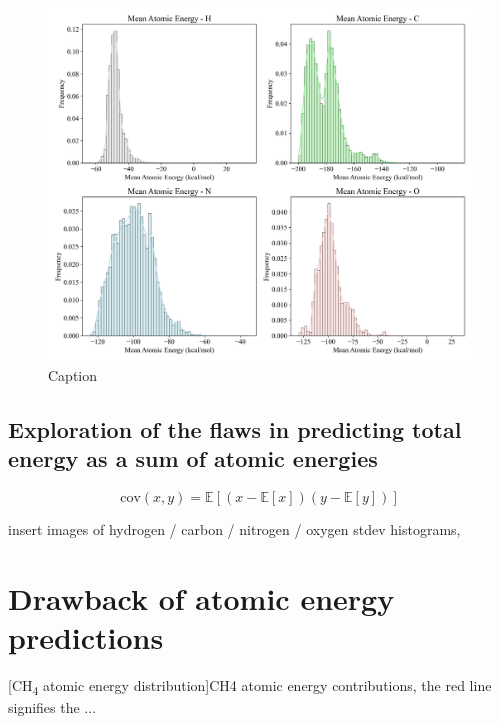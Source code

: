 \begin{figure}[!hb]
    \centering
    \includegraphics[width=1\linewidth]{Images/2xr_outputs/2xr_1x-first_mean-ae-per-atomtype.png}
    \caption{Caption}
    \label{fig:2xr_1x-first_mean-ae-per-atomtype}
\end{figure}

\subsection{Exploration of the flaws in predicting total energy as a sum of atomic energies}
\label{subsec:flaws_in_atomic_energies}


\begin{equation}
    \label{eq:covariance}
    \text{cov}(x, y) = \mathbb{E}[(x - \mathbb{E}[x])(y - \mathbb{E}[y])]
\end{equation}

insert images of hydrogen / carbon / nitrogen / oxygen stdev histograms, 



\section{Drawback of atomic energy predictions}



\begin{multiFigure}
\label{fig:ch4}
[CH\textsubscript{4} atomic energy distribution]{CH4 atomic energy contributions, the red line signifies the ...}
\end{multiFigure}


